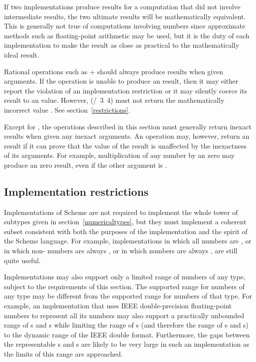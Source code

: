 \vest If two implementations produce  results for a
computation that did not involve  intermediate results,
the two ultimate results will be mathematically equivalent.  This is
generally not true of computations involving  numbers
since approximate methods such as floating-point arithmetic may be used,
but it is the duty of each implementation to make the result as close as
practical to the mathematically ideal result.

\vest Rational operations such as {\cf +} should always produce
 results when given  arguments.
If the operation is unable to produce an  result,
then it may either report the violation of an implementation restriction
or it may silently coerce its
result to an  value.
However, {\cf (/~3~4)} must not return the mathematically incorrect value {}.
See section~\ref{restrictions}.

\vest Except for , the operations described in
this section must generally return inexact results when given any inexact
arguments.  An operation may, however, return an  result if it can
prove that the value of the result is unaffected by the inexactness of its
arguments.  For example, multiplication of any number by an  zero
may produce an  zero result, even if the other argument is
.

\subsection{Implementation restrictions}

\label{restrictions}

\vest Implementations of Scheme are not required to implement the whole
tower of subtypes given in section~\ref{numericaltypes},
but they must implement a coherent subset consistent with both the
purposes of the implementation and the spirit of the Scheme language.
For example, implementations in which all numbers are ,
or in which non- numbers are always ,
or in which  numbers are always ,
are still quite useful.

\vest Implementations may also support only a limited range of numbers of
any type, subject to the requirements of this section.  The supported
range for  numbers of any type may be different from the
supported range for  numbers of that type.  For example,
an implementation that uses IEEE double-precision floating-point numbers to represent all its
  numbers may also
support a practically unbounded range of  s
and s
while limiting the range of  s (and therefore
the range of  s and s)
to the dynamic range of the IEEE double format.
Furthermore,
the gaps between the representable  s and
s are
likely to be very large in such an implementation as the limits of this
range are approached.

